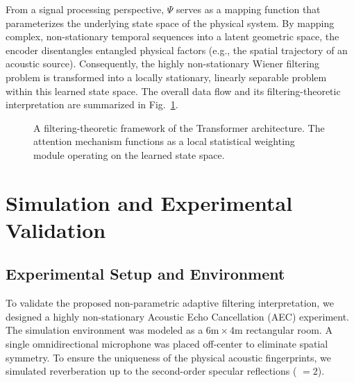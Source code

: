 \documentclass[conference]{IEEEtran}
\begin{document}
From a signal processing perspective, $\Psi$ serves as a mapping function that parameterizes the underlying state space of the physical system. By mapping complex, non-stationary temporal sequences into a latent geometric space, the encoder disentangles entangled physical factors (e.g., the spatial trajectory of an acoustic source). Consequently, the highly non-stationary Wiener filtering problem is transformed into a locally stationary, linearly separable problem within this learned state space. The overall data flow and its filtering-theoretic interpretation are summarized in Fig.~\ref{fig:block}.

\begin{figure}[htbp]
\centering
{}
\caption{A filtering-theoretic framework of the Transformer architecture. The attention mechanism functions as a local statistical weighting module operating on the learned state space.}
\label{fig:block}
\end{figure}

\section{Simulation and Experimental Validation}
\label{sec:simulation}

\subsection{Experimental Setup and Environment}
To validate the proposed non-parametric adaptive filtering interpretation, we designed a highly non-stationary Acoustic Echo Cancellation (AEC) experiment. The simulation environment was modeled as a $6\text{m} \times 4\text{m}$ rectangular room. A single omnidirectional microphone was placed off-center to eliminate spatial symmetry. To ensure the uniqueness of the physical acoustic fingerprints, we simulated reverberation up to the second-order specular reflections ( $= 2$).
\end{document}
